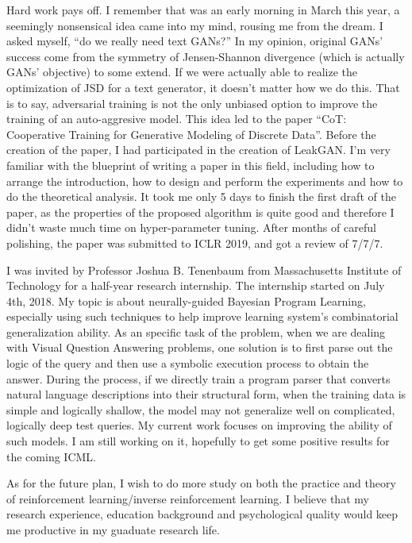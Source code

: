 \documentclass{article}
\begin{document}
      Hard work pays off. I remember that was an early morning in March this year, a seemingly nonsensical idea came into my mind, rousing me from the dream. I asked myself, ``do we really need text GANs?'' In my opinion, original GANs' success come from the symmetry of Jensen-Shannon divergence (which is actually GANs' objective) to some extend. If we were actually able to realize the optimization of JSD for a text generator, it doesn't matter how we do this. That is to say, adversarial training is not the only unbiased option to improve the training of an auto-aggresive model. This idea led to the paper ``CoT: Cooperative Training for Generative Modeling of Discrete Data''. Before the creation of the paper, I had participated in the creation of LeakGAN. I'm very familiar with the blueprint of writing a paper in this field, including how to arrange the introduction, how to design and perform the experiments and how to do the theoretical analysis. It took me only 5 days to finish the first draft of the paper, as the properties of the proposed algorithm is quite good and therefore I didn't waste much time on hyper-parameter tuning. After months of careful polishing, the paper was submitted to ICLR 2019, and got a review of 7/7/7. 

      I was invited by Professor Joshua B. Tenenbaum from Massachusetts Institute of Technology for a half-year research internship. The internship started on July 4th, 2018. My topic is about neurally-guided Bayesian Program Learning, especially using such techniques to help improve learning system's combinatorial generalization ability. As an specific task of the problem, when we are dealing with Visual Question Answering problems, one solution is to first parse out the logic of the query and then use a symbolic execution process to obtain the answer. During the process, if we directly train a program parser that converts natural language descriptions into their structural form, when the training data is simple and logically shallow, the model may not generalize well on complicated, logically deep test queries. My current work focuses on improving the ability of such models. I am still working on it, hopefully to get some positive results for the coming ICML.

      As for the future plan, I wish to do more study on both the practice and theory of reinforcement learning/inverse reinforcement learning. I believe that my research experience, education background and psychological quality would keep me productive in my guaduate research life.

    
\end{document}

